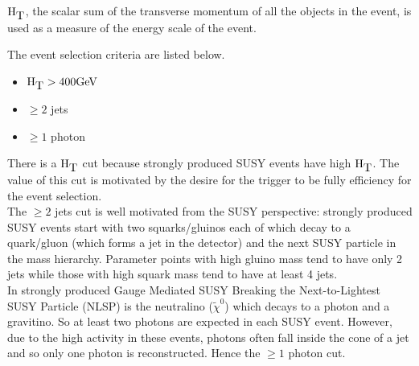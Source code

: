 $\mbox{H}_{\mbox{T}}$, the scalar sum of the transverse momentum of all the objects in the 
event, is used as a measure of the energy scale of the event.

The event selection criteria are listed below. 

\begin{itemize}
\item $\mbox{H}_{\mbox{T}} > 400 \mbox{GeV}$
\item $\geq 2$ jets
\item $\geq 1$ photon
\end{itemize}

There is a $\mbox{H}_{\mbox{T}}$ cut because strongly produced SUSY events have high $\mbox{H}_{\mbox{T}}$. The 
value of this cut is motivated by the desire for the trigger to be fully 
efficiency for the event selection. \\

The $\geq 2$ jets cut is well motivated from the SUSY perspective: strongly
produced SUSY events start with two squarks/gluinos each of which decay to a 
quark/gluon (which forms a jet in the detector) and the next SUSY particle in 
the mass hierarchy. Parameter points with high gluino mass tend to have only 2 
jets while those with high squark mass tend to have at least 4 jets. \\

In strongly produced Gauge Mediated SUSY Breaking the Next-to-Lightest SUSY 
Particle (NLSP) is the neutralino ($\tilde{\chi}^{0}$) which decays to a photon and 
a gravitino. So at least two photons are expected in each SUSY event. However, 
due to the high activity in these events, photons often fall inside the cone of
a jet and so only one photon is reconstructed. Hence the $\geq 1$ photon cut. \\
